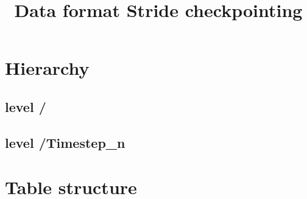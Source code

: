 \documentclass{article}
\title{Data format Stride checkpointing}
\begin{document}
	\maketitle
	\section{Hierarchy}
	\subsection{level /}
	\subsection{level /Timestep\_n}

	\section{Table structure}
\end{document}
